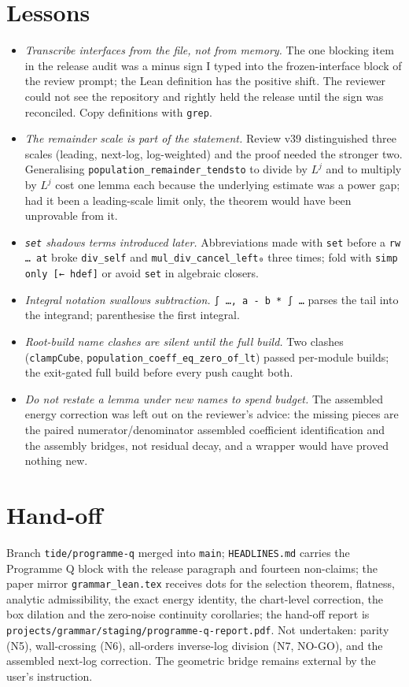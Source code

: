 \documentclass[11pt]{article}
\begin{document}
\section{Lessons}
\begin{itemize}
\item \emph{Transcribe interfaces from the file, not from memory.} The one blocking item in the
release audit was a minus sign I typed into the frozen-interface block of the review prompt; the
Lean definition has the positive shift. The reviewer could not see the repository and rightly held
the release until the sign was reconciled. Copy definitions with \texttt{grep}.
\item \emph{The remainder scale is part of the statement.} Review v39 distinguished three scales
(leading, next-log, log-weighted) and the proof needed the stronger two. Generalising
\texttt{population\_remainder\_tendsto} to divide by $L^j$ and to multiply by $L^j$ cost one lemma
each because the underlying estimate was a power gap; had it been a leading-scale limit only, the
theorem would have been unprovable from it.
\item \emph{\texttt{set} shadows terms introduced later.} Abbreviations made with \texttt{set}
before a \texttt{rw \dots\ at} broke \texttt{div\_self} and \texttt{mul\_div\_cancel\_left₀} three
times; fold with \texttt{simp only [← hdef]} or avoid \texttt{set} in algebraic closers.
\item \emph{Integral notation swallows subtraction.} \verb|∫ …, a - b * ∫ …| parses the tail into the
integrand; parenthesise the first integral.
\item \emph{Root-build name clashes are silent until the full build.} Two clashes
(\texttt{clampCube}, \texttt{population\_coeff\_eq\_zero\_of\_lt}) passed per-module builds; the
exit-gated full build before every push caught both.
\item \emph{Do not restate a lemma under new names to spend budget.} The assembled energy correction
was left out on the reviewer's advice: the missing pieces are the paired numerator/denominator
assembled coefficient identification and the assembly bridges, not residual decay, and a wrapper
would have proved nothing new.
\end{itemize}

\section{Hand-off}
Branch \texttt{tide/programme-q} merged into \texttt{main}; \texttt{HEADLINES.md} carries the
Programme Q block with the release paragraph and fourteen non-claims; the paper mirror
\texttt{grammar\_lean.tex} receives dots for the selection theorem, flatness, analytic admissibility,
the exact energy identity, the chart-level correction, the box dilation and the zero-noise
continuity corollaries; the hand-off report is
\texttt{projects/grammar/staging/programme-q-report.pdf}. Not undertaken: parity (N5),
wall-crossing (N6), all-orders inverse-log division (N7, NO-GO), and the assembled next-log
correction. The geometric bridge remains external by the user's instruction.
\end{document}
